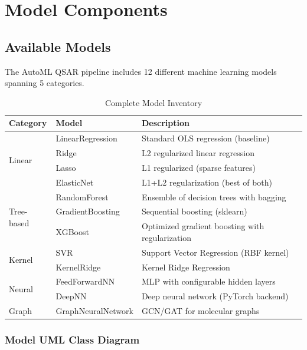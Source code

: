 \documentclass[11pt,a4paper]{article}
\begin{document}
\section{Model Components}

\subsection{Available Models}

The AutoML QSAR pipeline includes 12 different machine learning models spanning 5 categories.

\begin{table}[H]
\centering
\caption{Complete Model Inventory}
\begin{tabular}{@{}llp{7cm}@{}}
\toprule
\textbf{Category} & \textbf{Model} & \textbf{Description} \\
\midrule
\multirow{4}{*}{Linear} & LinearRegression & Standard OLS regression (baseline) \\
 & Ridge & L2 regularized linear regression \\
 & Lasso & L1 regularized (sparse features) \\
 & ElasticNet & L1+L2 regularization (best of both) \\
\midrule
\multirow{3}{*}{Tree-based} & RandomForest & Ensemble of decision trees with bagging \\
 & GradientBoosting & Sequential boosting (sklearn) \\
 & XGBoost & Optimized gradient boosting with regularization \\
\midrule
\multirow{2}{*}{Kernel} & SVR & Support Vector Regression (RBF kernel) \\
 & KernelRidge & Kernel Ridge Regression \\
\midrule
\multirow{2}{*}{Neural} & FeedForwardNN & MLP with configurable hidden layers \\
 & DeepNN & Deep neural network (PyTorch backend) \\
\midrule
Graph & GraphNeuralNetwork & GCN/GAT for molecular graphs \\
\bottomrule
\end{tabular}
\end{table}

\subsubsection{Model UML Class Diagram}
\end{document}
